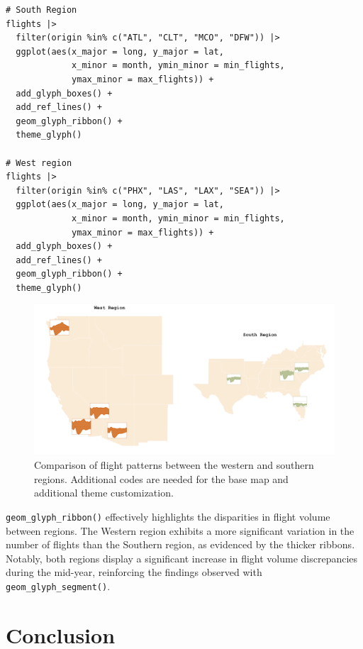 \begin{verbatim}
# South Region
flights |> 
  filter(origin %in% c("ATL", "CLT", "MCO", "DFW")) |>
  ggplot(aes(x_major = long, y_major = lat,
             x_minor = month, ymin_minor = min_flights,
             ymax_minor = max_flights)) + 
  add_glyph_boxes() +
  add_ref_lines() +
  geom_glyph_ribbon() +
  theme_glyph()

# West region
flights |> 
  filter(origin %in% c("PHX", "LAS", "LAX", "SEA")) |>
  ggplot(aes(x_major = long, y_major = lat,
             x_minor = month, ymin_minor = min_flights,
             ymax_minor = max_flights)) + 
  add_glyph_boxes() +
  add_ref_lines() +
  geom_glyph_ribbon() +
  theme_glyph()
\end{verbatim}

\begin{figure}

{\centering \includegraphics[width=1\linewidth]{figures/west_south} 

}

\caption{Comparison of flight patterns between the western and southern regions. Additional codes are needed for the base map and additional theme customization.}\label{fig:unnamed-chunk-25}
\end{figure}

\texttt{geom\_glyph\_ribbon()} effectively highlights the disparities in flight volume between regions. The Western region exhibits a more significant variation in the number of flights than the Southern region, as evidenced by the thicker ribbons. Notably, both regions display a significant increase in flight volume discrepancies during the mid-year, reinforcing the findings observed with \texttt{geom\_glyph\_segment()}.

\hypertarget{conclusion}{%
\section{Conclusion}\label{conclusion}}


